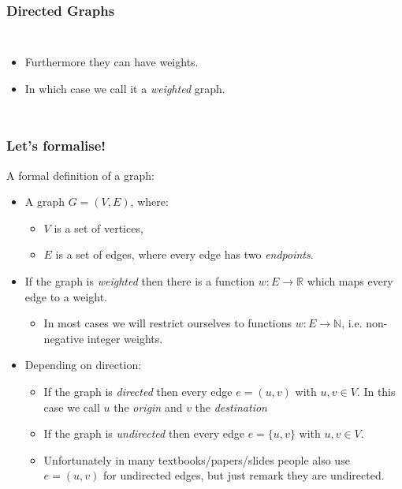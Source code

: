 \begin{frame}
	\frametitle{Directed Graphs}
	
	\begin{columns}[T]

			


		\begin{itemize}
			\item Furthermore they can have weights.
			\item In which case we call it a \textit{weighted} graph.
		\end{itemize}
		

	\end{columns}
\end{frame}


\begin{frame}
	\frametitle{Let's formalise!}

A formal definition of a graph:
			\begin{itemize}
				\item A graph $G=(V,E)$, where:
					\begin{itemize}
						\item $V$ is a set of vertices,
						\item $E$ is a set of edges, where every edge has two \textit{endpoints}.
					\end{itemize}
					
				\item If the graph is \textit{weighted} then there is a function $w: E \to \mathbb{R}$ which maps every edge to
					a weight.
					
					\begin{itemize}
						\item In most cases we will restrict ourselves to functions $w: E \to \mathbb{N}$, i.e. non-negative integer weights.
					\end{itemize}
					
				\item Depending on direction:
					\begin{itemize}
					
						\item If the graph is \textit{directed} then every edge $e = (u,v)$ with $u,v \in V$. In this case we call
							$u$ the \textit{origin} and $v$ the \textit{destination}
					
				\item If the graph is \textit{undirected} then every edge $e = \{u,v\}$ with $u,v \in V$.
				\item Unfortunately in many textbooks/papers/slides people also use $e=(u,v)$ for undirected edges, but just remark they are
					undirected.
					\end{itemize}
			\end{itemize}
\end{frame}

